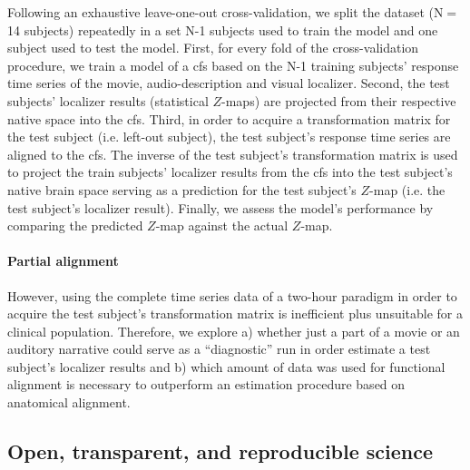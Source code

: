%
Following an exhaustive leave-one-out cross-validation, we split the dataset
(N$=$14 subjects) repeatedly in a set N-1 subjects used to train the model and
one subject used to test the model.
%
First, for every fold of the cross-validation procedure, we train a model of a
\ac{cfs} based on the N-1 training subjects' response time series of the movie,
audio-description and visual localizer.
%
Second, the test subjects' localizer results (statistical $Z$-maps) are
projected from their respective native space into the \ac{cfs}.
%
Third, in order to acquire a transformation matrix for the test subject (i.e.
left-out subject), the test subject's response time series are aligned to the
\ac{cfs}.
%
The inverse of the test subject's transformation matrix is used to project the
train subjects' localizer results from the \ac{cfs} into the test subject's
native brain space serving as a prediction for the test subject's $Z$-map (i.e.
the test subject's localizer result).
%
Finally, we assess the model's performance by comparing the predicted $Z$-map
against the actual $Z$-map.


\paragraph{Partial alignment}
However, using the complete time series data of a two-hour paradigm in order to
acquire the test subject's transformation matrix is inefficient plus unsuitable
for a clinical population.
%
Therefore, we explore a) whether just a part of a movie or an auditory narrative
could serve as a ``diagnostic'' run in order estimate a test
subject's localizer results and b)  which amount of data was used for functional
alignment is necessary to outperform an estimation procedure based on anatomical
alignment.


\subsection{Open, transparent, and reproducible science}

